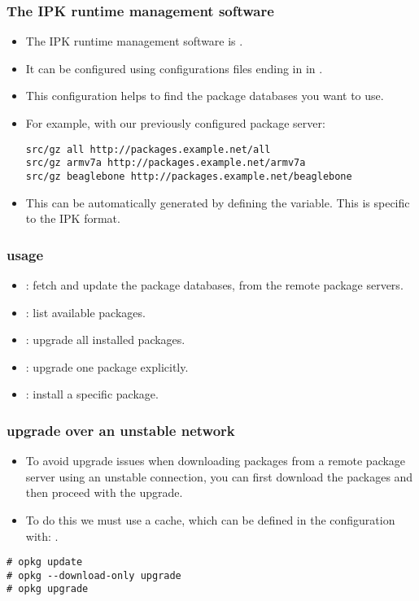 \begin{frame}[fragile]
  \frametitle{The IPK runtime management software}
  \begin{itemize}
    \item The IPK runtime management software is .
    \item It can be configured using configurations files ending in
       in .
    \item This configuration helps  to find the package
      databases you want to use.
    \item For example, with our previously configured package server:
    \begin{block}{}
      \begin{verbatim}
src/gz all http://packages.example.net/all
src/gz armv7a http://packages.example.net/armv7a
src/gz beaglebone http://packages.example.net/beaglebone
      \end{verbatim}
    \end{block}
    \item This can be automatically generated by defining the
       variable. This is specific to the
      IPK format.
  \end{itemize}
\end{frame}

\begin{frame}
  \frametitle{ usage}
  \begin{itemize}
    \item {}: fetch and update the package
      databases, from the remote package servers.
    \item {}: list available packages.
    \item {}: upgrade all installed packages.
    \item {}: upgrade one package
      explicitly.
    \item {}: install a specific package.
  \end{itemize}
\end{frame}

\begin{frame}[fragile]
  \frametitle{ upgrade over an unstable network}
  \begin{itemize}
    \item To avoid upgrade issues when downloading packages from a
      remote package server using an unstable connection, you can
      first download the packages and then proceed with the upgrade.
    \item To do this we must use a cache, which can be defined in the
       configuration with:
      .
  \end{itemize}
  \begin{block}{}
    \begin{verbatim}
# opkg update
# opkg --download-only upgrade
# opkg upgrade
    \end{verbatim}
  \end{block}
\end{frame}

